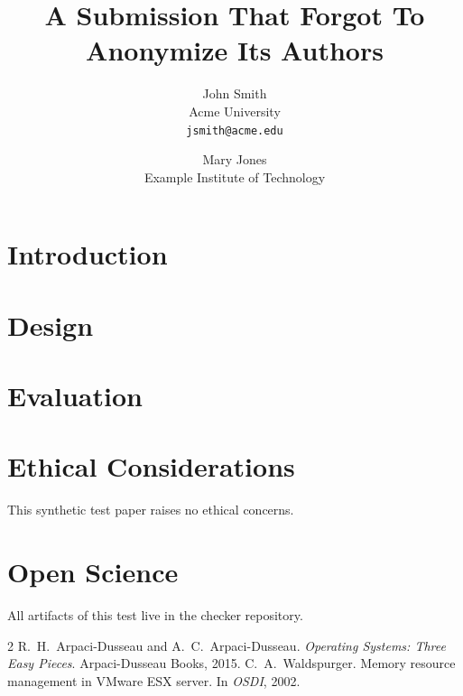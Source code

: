 \documentclass[letterpaper,twocolumn,10pt]{article}
\date{}
\title{\Large \bf A Submission That Forgot To Anonymize Its Authors}
\author{{\rm John Smith}\\Acme University\\{\tt jsmith@acme.edu}
  \and {\rm Mary Jones}\\Example Institute of Technology}
\begin{document}
\maketitle

\begin{abstract}
\lipsum[1][1-5]
\end{abstract}

\section{Introduction}
\lipsum[2-4]

\section{Design}
\lipsum[5-7]

\section{Evaluation}
\lipsum[8-9]

\appendix
\section*{Ethical Considerations}
This synthetic test paper raises no ethical concerns.

\section*{Open Science}
All artifacts of this test live in the checker repository.

\begin{thebibliography}{2}
 R.~H.\ Arpaci-Dusseau and A.~C.\ Arpaci-Dusseau.
  \emph{Operating Systems: Three Easy Pieces}. Arpaci-Dusseau Books, 2015.
 C.~A.\ Waldspurger. Memory resource management in VMware ESX
  server. In \emph{OSDI}, 2002.
\end{thebibliography}
\end{document}
